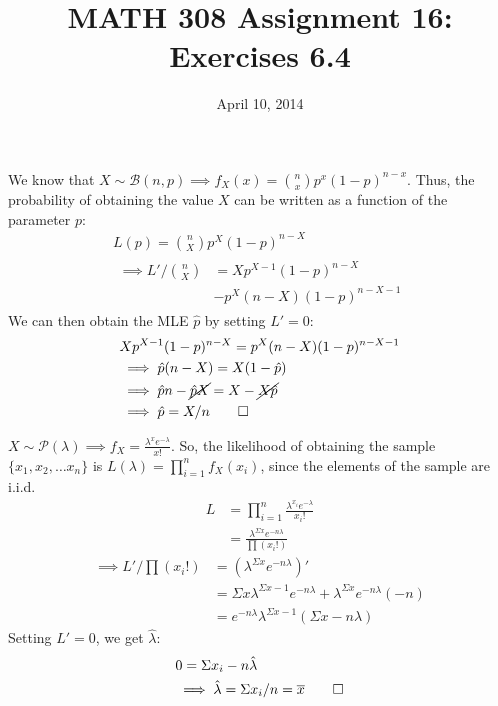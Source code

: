 \documentclass[twocolumn]{article}
\title{MATH 308 Assignment 16:\\Exercises 6.4}
\date{April 10, 2014}
\newcommand{\phat}{\ensuremath{\hat{p}}}
\newcommand{\lhat}{\hat{\lambda}}
\begin{document}
\maketitle

We know that $X\sim\mathcal{B}(n,p)\implies f_X(x)=\binom{n}{x}p^x(1-p)^{n-x}$. Thus, the probability of obtaining the value $X$ can be written as a function of the parameter $p$:
\begin{gather*}
L(p)=\binom{n}{X}p^X(1-p)^{n-X}\\
\begin{aligned}
\implies L'/\binom{n}{X}&=Xp^{X-1}(1-p)^{n-X}\\
&-p^X(n-X)(1-p)^{n-X-1}
\end{aligned}
\end{gather*}
We can then obtain the MLE \phat{} by setting $L'=0$:\begin{align*}
&Xp^{X-1}(1-p)^{n-X}=p^X(n-X)(1-p)^{n-X-1}\\
&\implies \phat(n-X)=X(1-\phat)\\
&\implies \phat n-\cancel{\phat X}=X-\cancel{X\phat}\\
&\implies \phat=X/n \qed
\end{align*}

$X\sim\mathcal{P}(\lambda)\implies f_X=\frac{\lambda^xe^{-\lambda}}{x!}$. So, the likelihood of obtaining the sample $\{x_1,x_2,\ldots x_n\}$ is $L(\lambda)=\prod_{i=1}^nf_X(x_i)$, since the elements of the sample are i.i.d.\begin{align*}
L&=\prod_{i=1}^n\frac{\lambda^{x_i}e^{-\lambda}}{x_i!}\\
&=\frac{\lambda^{\Sigma x}e^{-n\lambda}}{\prod (x_i!)}
\end{align*}
\begin{align*}
\implies L'/\prod (x_i!)&= \left(\lambda^{\Sigma x}e^{-n\lambda}\right)'\\
&= \Sigma x \lambda^{\Sigma x-1} e^{-n\lambda}
+ \lambda^{\Sigma x}e^{-n\lambda}(-n)\\
&=e^{-n\lambda}\lambda^{\Sigma x-1}\left( \Sigma x - n\lambda \right)
\end{align*}
Setting $L'=0$, we get $\lhat$:\begin{align*}
&0=\Sigma x_i - n\lhat\\
&\implies\lhat= \Sigma x_i/n = \overline{x}\qed
\end{align*}
\end{document}
